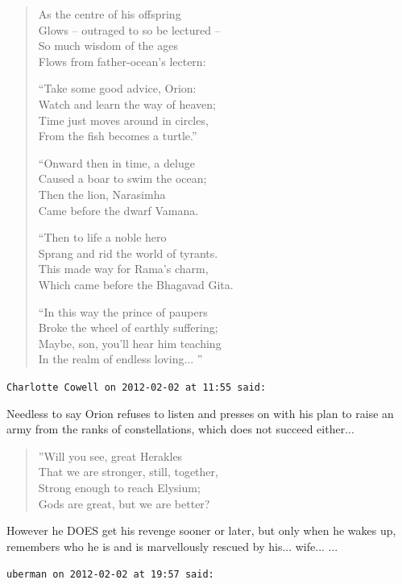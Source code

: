 \begin{footnotesize}
\begin{sffamily}
\begin{verse}
As the centre of his offspring\\
Glows -- outraged to so be lectured --\\
So much wisdom of the ages\\
Flows from father-ocean's lectern:

``Take some good advice, Orion:\\
Watch and learn the way of heaven;\\
Time just moves around in circles,\\
From the fish becomes a turtle.''

``Onward then in time, a deluge\\
Caused a boar to swim the ocean;\\
Then the lion, Narasimha\\
Came before the dwarf Vamana.

``Then to life a noble hero\\
Sprang and rid the world of tyrants.\\
This made way for Rama's charm,\\
Which came before the Bhagavad Gita.

``In this way the prince of paupers\\
Broke the wheel of earthly suffering;\\
Maybe, son, you'll hear him teaching\\
In the realm of endless loving... ''
\end{verse}

\hfill

\texttt{Charlotte Cowell on 2012-02-02 at 11:55 said:}

Needless to say Orion refuses to listen and presses on with his plan to raise an army from the ranks of constellations, which does not succeed either... 

\begin{verse}
''Will you see, great Herakles\\
That we are stronger, still, together,\\
Strong enough to reach Elysium;\\
Gods are great, but we are better?
\end{verse}

However he DOES get his revenge sooner or later, but only when he wakes up, remembers who he is and is marvellously rescued by his... wife... ... 

\hfill

\texttt{uberman on 2012-02-02 at 19:57 said:}


\end{sffamily}
\end{footnotesize}
